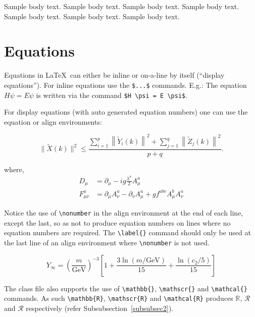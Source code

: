 \documentclass[sn-basic,pdflatex]{sn-jnl}
\theoremstyle{remark}
\theoremstyle{definition}
\begin{document}
Sample body text. Sample body text. Sample body text. Sample body text.
Sample body text. Sample body text. Sample body text.

\hypertarget{sec4}{%
\section{Equations}\label{sec4}}

Equations in \LaTeX~can either be inline or on-a-line by itself
(``display equations''). For inline equations use the \texttt{\$...\$}
commands. E.g.: The equation \(H\psi = E \psi\) is written via the
command \texttt{\$H\ \textbackslash{}psi\ =\ E\ \textbackslash{}psi\$}.

For display equations (with auto generated equation numbers) one can use
the equation or align environments:

\begin{equation}
\|\tilde{X}(k)\|^2 \leq\frac{\sum\limits_{i=1}^{p}\left\|\tilde{Y}_i(k)\right\|^2+\sum\limits_{j=1}^{q}\left\|\tilde{Z}_j(k)\right\|^2 }{p+q}.\label{eq1}
\end{equation}

where, \begin{align}
D_\mu &=  \partial_\mu - ig \frac{\lambda^a}{2} A^a_\mu \nonumber \\
F^a_{\mu\nu} &= \partial_\mu A^a_\nu - \partial_\nu A^a_\mu + g f^{abc} A^b_\mu A^a_\nu \label{eq2}
\end{align}

Notice the use of \texttt{\textbackslash{}nonumber} in the align
environment at the end of each line, except the last, so as not to
produce equation numbers on lines where no equation numbers are
required. The \texttt{\textbackslash{}label\{\}} command should only be
used at the last line of an align environment where
\texttt{\textbackslash{}nonumber} is not used.

\begin{equation}
Y_\infty = \left( \frac{m}{\textrm{GeV}} \right)^{-3}
    \left[ 1 + \frac{3 \ln(m/\textrm{GeV})}{15}
    + \frac{\ln(c_2/5)}{15} \right]
\end{equation}

The class file also supports the use of
\texttt{\textbackslash{}mathbb\{\}},
\texttt{\textbackslash{}mathscr\{\}} and
\texttt{\textbackslash{}mathcal\{\}} commands. As such
\texttt{\textbackslash{}mathbb\{R\}},
\texttt{\textbackslash{}mathscr\{R\}} and
\texttt{\textbackslash{}mathcal\{R\}} produces \(\mathbb{R}\),
\(\mathscr{R}\) and \(\mathcal{R}\) respectively (refer
Subsubsection~\ref{subsubsec2}).
\end{document}
